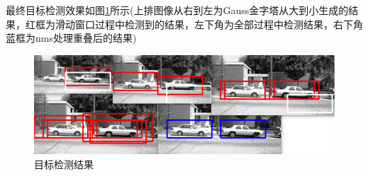 \documentclass[12pt, a4paper, oneside]{ctexart}
\numberwithin{equation}{section}  %
\begin{document}
最终目标检测效果如图\ref{fig-detections}所示(上排图像从右到左为Gauss金字塔从大到小生成的结果，红框为滑动窗口过程中检测到的结果，左下角为全部过程中检测结果，右下角蓝框为nms处理重叠后的结果)
\begin{figure}[htbp]
  \centering
  \includegraphics[scale=0.5]{detections.png}
  \caption{目标检测结果}
  \label{fig-detections}
\end{figure}
\end{document}
